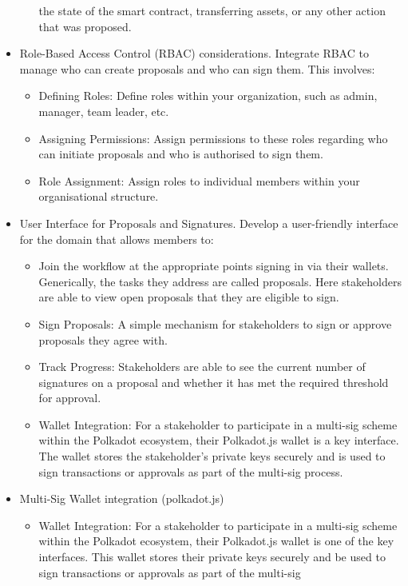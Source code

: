 \documentclass{tufte-handout}
\begin{document}
\begin{itemize}
\begin{itemize}
        the state of the smart contract, transferring assets, or any other action that was proposed.
    \end{itemize}
    \item Role-Based Access Control (RBAC) considerations. Integrate RBAC to manage who can create proposals and who can sign them. This involves:
    \begin{itemize}
        \item Defining Roles: Define roles within your organization, such as admin, manager, team leader, etc.
        \item Assigning Permissions: Assign permissions to these roles regarding who can initiate proposals and who is authorised to sign them.
        \item Role Assignment: Assign roles to individual members within your organisational structure.
    \end{itemize}
    \item User Interface for Proposals and Signatures. Develop a user-friendly interface for the domain that allows members to:
    \begin{itemize}
        \item Join the workflow at the appropriate points signing in via their wallets. Generically, the tasks they address are called proposals.
        Here stakeholders are able to view open proposals that they are eligible to sign.
        \item Sign Proposals: A simple mechanism for stakeholders to sign or approve proposals they agree with.
        \item Track Progress: Stakeholders are able to see the current number of signatures on a proposal and whether it has met the required
        threshold for approval.
        \item Wallet Integration: For a stakeholder to participate in a multi-sig scheme within the Polkadot ecosystem, their Polkadot.js wallet
        is a key interface. The wallet stores the stakeholder's private keys securely and is used to sign transactions or approvals as
        part of the multi-sig process.
    \end{itemize}
    \item Multi-Sig Wallet integration (polkadot.js)
    \begin{itemize}
        \item Wallet Integration: For a stakeholder to participate in a multi-sig scheme within the Polkadot ecosystem, their Polkadot.js wallet
        is one of the key interfaces. This wallet stores their private keys securely and be used to sign transactions or approvals as part of the multi-sig

\end{itemize}
\end{itemize}
\end{document}
